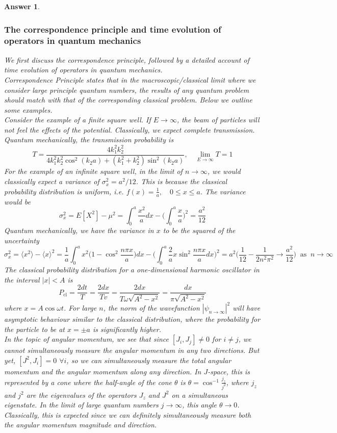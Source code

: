 \documentclass[a4paper]{article}
\newtheorem{ans}{Answer}[subsection]
\theoremstyle{new}
\begin{document}
\begin{ans}
\subsubsection*{The correspondence principle and time evolution of operators in quantum mechanics}
We first discuss the correspondence principle, followed by a detailed account of time evolution of operators in quantum mechanics.\\[5pt]
Correspondence Principle states that in the macroscopic/classical limit where we consider large principle quantum numbers, the results of any quantum problem should match with that of the corresponding classical problem. Below we outline some examples.\\[5pt]
Consider the example of a finite square well. If $E\rightarrow\infty$, the beam of particles will not feel the effects of the potential. Classically, we expect complete transmission. Quantum mechanically, the transmission probability is
$$T=\frac{4k_1^2k_2^2}{4k_1^2k_2^2\cos^2(k_2a)+(k_1^2+k_2^2)\sin^2(k_2a)},\quad\lim_{E\rightarrow\infty}T=1$$
For the example of an infinite square well, in the limit of $n\rightarrow\infty$, we would classically expect a variance of $\sigma_x^2=a^2/12$. This is because the classical probability distribution is uniform, i.e. $f(x)=\frac{1}{a},\quad 0\leq x\leq a$. The variance would be
$$\sigma_x^2=E[X^2]-\mu^2=\int_0^a\frac{x^2}{a}dx-\bigg(\int_0^a\frac{x}{a}\bigg)^2=\frac{a^2}{12}$$
Quantum mechanically, we have the variance in $x$ to be the squared of the uncertainty
$$\sigma_x^2=\langle x^2\rangle-\langle x\rangle^2=\frac{1}{a}\int_0^ax^2\bigg(1-\cos^2\frac{n\pi x}{a}\bigg)dx-\bigg(\int_0^a\frac{2}{a}x\sin^2\frac{n\pi x}{a}dx\bigg)^2=a^2\bigg(\frac{1}{12}-\frac{1}{2n^2\pi^2}\rightarrow\frac{a^2}{12}\bigg)~\text{ as }~n\rightarrow\infty$$
The classical probability distribution for a one-dimensional harmonic oscillator in the interval $|x|<A$ is
$$P_{\text{cl}}=\frac{2dt}{T}=\frac{2dx}{Tv}=\frac{2dx}{T\omega\sqrt{A^2-x^2}}=\frac{dx}{\pi\sqrt{A^2-x^2}}$$
where $x=A\cos\omega t$. For large $n$, the norm of the wavefunction $|\psi_{n\rightarrow\infty}|^2$ will have asymptotic behaviour similar to the classical distribution, where the probability for the particle to be at $x=\pm a$ is significantly higher.\\[5pt]
In the topic of angular momentum, we see that since $[J_i,J_j]\neq 0$ for $i\neq j$, we cannot simultaneously measure the angular momentum in any two directions. But yet, $[J^2,J_i]=0$ $\forall i$, so we can simultaneously measure the total angular momentum and the angular momentum along any direction. In $J$-space, this is represented by a cone where the half-angle of the cone $\theta$ is $\theta=\cos^{-1}\frac{j_z}{j^2}$, where $j_z$ and $j^2$ are the eigenvalues of the operators $J_z$ and $J^2$ on a simultaneous eigenstate. In the limit of large quantum numbers $j\rightarrow\infty$, this angle $\theta\rightarrow 0$. Classically, this is expected since we can definitely simultaneously measure both the angular momentum magnitude and direction.\\[5pt]

\end{ans}
\end{document}
